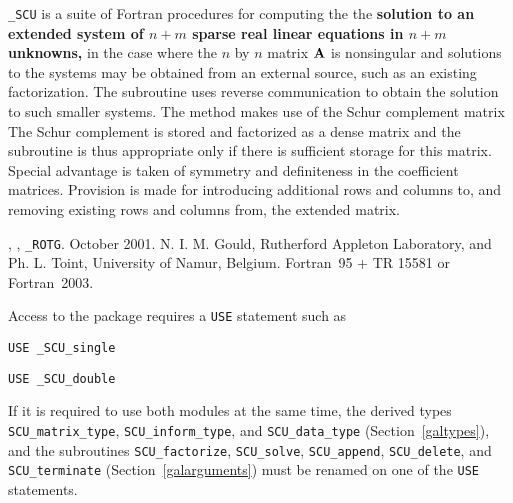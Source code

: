 \documentclass{galahad}
\newcommand{\packagename}{SCU}
\newcommand{\fullpackagename}{\libraryname\-\_\-\packagename}
\begin{document}
\galheader


\galsummary

{\tt \fullpackagename} is a suite of Fortran procedures for
computing the
the {\bf solution to an extended system of $n + m$
sparse real linear equations in $n  +  m$ unknowns,}
in the case where the $n$ by $n$ matrix ${\mathbf{A}}$ is nonsingular
and solutions to the systems
may be obtained from an external source, such as an existing
factorization.  The subroutine uses reverse communication to obtain
the solution to such smaller systems.  The method makes use of
the Schur complement matrix
The Schur complement is stored and factorized as a dense matrix
and the subroutine is thus appropriate only if there is
sufficient storage for this matrix. Special advantage is taken
of symmetry and definiteness in the coefficient matrices.
Provision is made for introducing additional rows and columns
to, and removing existing rows and columns from, the extended
matrix.


\galattributes
\galversions{\tt  \fullpackagename\_single, \fullpackagename\_double},
, {\tt \_ROTG}.
\galdate October 2001.
\galorigin N. I. M. Gould, Rutherford Appleton Laboratory, and
Ph. L. Toint, University of Namur, Belgium.
\gallanguage Fortran~95 + TR 15581 or Fortran~2003.


\galhowto

Access to the package requires a {\tt USE} statement such as

\medskip{}

\hskip0.5in {\tt USE \fullpackagename\_single}

\medskip{}

\hskip0.5in {\tt USE  \fullpackagename\_double}

\medskip

\noindent
If it is required to use both modules at the same time, the derived types
{\tt \packagename\_matrix\_type},
{\tt \packagename\_inform\_type}, and
{\tt \packagename\_data\_type}
(Section~\ref{galtypes}),
and the subroutines
{\tt \packagename\_factorize},
{\tt \packagename\_solve},
{\tt \packagename\_append},
{\tt \packagename\_delete},
and
{\tt \packagename\_terminate}
(Section~\ref{galarguments})
must be renamed on one of the {\tt USE} statements.
\end{document}

